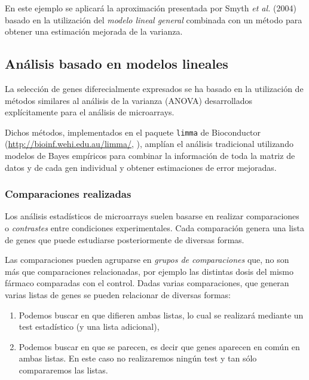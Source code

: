 \documentclass[a4paper]{article}\usepackage[]{graphicx}\usepackage[]{color}
\makeatletter
\newenvironment{kframe}{%
 \def\at@end@of@kframe{}%
 \ifinner\ifhmode%
  \def\at@end@of@kframe{\end{minipage}}%
  \begin{minipage}{\columnwidth}%
 \fi\fi%
 \def\FrameCommand##1{\hskip\@totalleftmargin \hskip-\fboxsep
 \colorbox{shadecolor}{##1}\hskip-\fboxsep
     \hskip-\linewidth \hskip-\@totalleftmargin \hskip\columnwidth}%
 \MakeFramed {\advance\hsize-\width
   \@totalleftmargin\z@ \linewidth\hsize
   \@setminipage}}%
 {\par\unskip\endMakeFramed%
 \at@end@of@kframe}
\newenvironment{knitrout}{}{} %
\newcommand{\Rpackage}[1]{{\texttt{#1}}}
\makeatother
\begin{document}
En este ejemplo se aplicará la aproximación presentada por Smyth
\emph{et al.} (2004) basado en la utilización del \emph{modelo lineal
  general} combinada con un método para obtener una estimación
mejorada de la varianza.


\subsection{Análisis basado en modelos lineales}

La selección de genes diferecialmente expresados se ha basado en la
utilización de métodos similares al análisis de la varianza (ANOVA)
desarrollados explícitamente para el análisis de microarrays.

Dichos métodos, implementados en el paquete \Rpackage {limma} de
Bioconductor (\url{http://bioinf.wehi.edu.au/limma/},
\cite{Smyth:2004}), amplían el análisis tradicional utilizando modelos
de Bayes empíricos para combinar la información de toda la matriz de
datos y de cada gen individual y obtener estimaciones de error
mejoradas.

\begin{knitrout}
\color{fgcolor}\begin{kframe}


{\ttfamily\noindent\itshape\color{messagecolor}{\#\# Loading required package: limma\\\#\# \\\#\# Attaching package: 'limma'\\\#\# \\\#\# The following object is masked from 'package:BiocGenerics':\\\#\# \\\#\#\ \ \ \  plotMA}}\end{kframe}
\end{knitrout}

\subsubsection{Comparaciones realizadas}

Los análisis estadísticos de microarrays suelen basarse en realizar
comparaciones o \emph{contrastes} entre condiciones
experimentales. Cada comparación genera una lista de genes que puede
estudiarse posteriormente de diversas formas.

Las comparaciones pueden agruparse en \emph{grupos de comparaciones}
que, no son más que comparaciones relacionadas, por ejemplo las
distintas dosis del mismo fármaco comparadas con el control. Dadas
varias comparaciones, que generan varias listas de genes se pueden
relacionar de diversas formas:
\begin{enumerate}
\item Podemos buscar en que difieren ambas listas, lo cual se
  realizará mediante un test estadístico (y una lista adicional),
\item Podemos buscar en que se parecen, es decir que genes aparecen en común en ambas listas. En este caso no realizaremos ningún test y tan sólo compararemos las listas. 
\end{enumerate}
\end{document}
